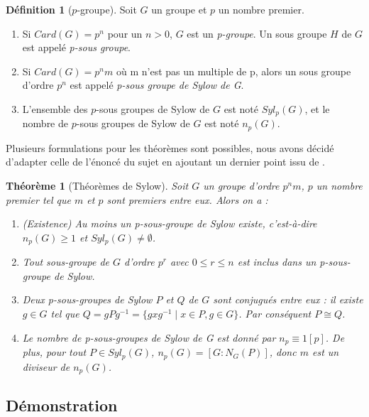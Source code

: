 \documentclass{article}
\theoremstyle{definition}
\newtheorem{definition}[subsubsection]{Définition}
\theoremstyle{plain}
\newtheorem{theorem}[subsubsection]{Théorème}
\theoremstyle{plain}
\theoremstyle{plain}
\theoremstyle{plain}
\theoremstyle{definition}
\theoremstyle{plain}
\theoremstyle{plain}
\begin{document}
\begin{definition}[\ensuremath{p}-groupe]
	Soit \( G \) un groupe et \( p \) un nombre premier.
	\begin{enumerate}[label = (\roman*)]
	\item Si \( Card(G) = p^{n} \) pour un \( n > 0 \), \( G \) est un \textit{p-groupe}. Un sous groupe \( H \) de \( G \) est appelé \textit{p-sous groupe}.
	\item Si \( Card(G) = p^{n}m \) où m n'est pas un multiple de p, alors un sous groupe d'ordre \( p^{n} \) est appelé \textit{p-sous groupe de Sylow de G}.
	\item L'ensemble des \(p\)-sous groupes de Sylow de \( G \) est noté \( Syl_{p}(G) \), et le nombre de \(p\)-sous groupes de Sylow de \( G \) est noté \( n_{p}(G) \).
	\end{enumerate}
\end{definition}

Plusieurs formulations pour les théorèmes sont possibles, nous avons décidé d'adapter celle de l'énoncé du sujet en ajoutant un dernier point issu de \cite[p.~215]{chen2024napkin}.

\begin{theorem}[Théorèmes de Sylow]\label{theorem:S}
	Soit \( G \) un groupe d'ordre \( p^{n}m \), \( p \) un nombre premier tel que \( m \) et \( p \) sont premiers entre eux. Alors on a :
	\begin{enumerate}[label={\upshape(\roman*)}]
		\item (Existence) Au moins un p-sous-groupe de Sylow existe, c'est-à-dire \( n_{p}(G) \geq 1 \) et \( Syl_{p}(G) \neq \emptyset \).\label{S1}
		\item Tout sous-groupe de \( G \) d'ordre \( p^{r} \) avec \( 0 \leq r \leq n \) est inclus dans un p-sous-groupe de Sylow. \label{S2}
		\item Deux p-sous-groupes de Sylow \( P \) et \( Q \) de \( G \) sont conjugués entre eux : il existe \( g \in G \) tel que \( Q = gPg^{-1} = \{ gxg^{-1} \mid x \in P, g \in G \} \). Par conséquent \( P \cong Q \).\label{S3}
		\item Le nombre de p-sous-groupes de Sylow de G est donné par \( n_{p} \equiv 1 [p] \). De plus, pour tout \( P \in Syl_{p}({G}) \), \( n_{p}({G}) = [G : N_{G}({P}) ] \), donc \( m \) est un diviseur de \( n_p({G}) \).\label{S4}
	\end{enumerate}

\end{theorem}

\subsection{Démonstration}
\end{document}
